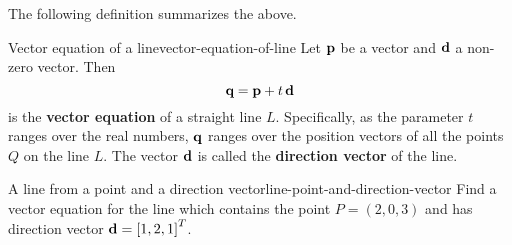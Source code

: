\begin{center}
\end{center}
The following definition summarizes the above.

\begin{definition}{Vector equation of a line}{vector-equation-of-line}
  Let $\vect{p}$ be a vector and $\vect{d}$ a non-zero vector. Then
  \begin{equation*}
    \vect{q} = \vect{p} + t\,\vect{d}
  \end{equation*}
  is the \textbf{vector equation}%
   of a straight line $L$. Specifically,
  as the parameter $t$ ranges over the real numbers, $\vect{q}$ ranges
  over the position vectors of all the points $Q$ on the line $L$.
  The vector $\vect{d}$ is called the \textbf{direction vector}%
   of the line.
\end{definition}

\begin{example}{A line from a point and a direction vector}{line-point-and-direction-vector}
  Find a vector equation for the line which contains the point
  $P = (2,0,3)$ and has direction vector
  $\vect{d} = \mat{1,2,1}^T$.
\end{example}

